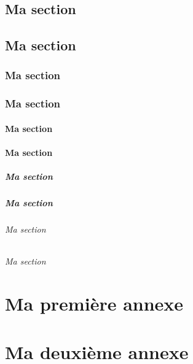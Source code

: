 \documentclass[overfullbox]{polytech/polytech}
\begin{document}
\section{Ma section}
\lipsum[1-5]

\section{Ma section}
\lipsum[1-5]

\subsection{Ma section}
\lipsum[1-5]
\subsection{Ma section}
\lipsum[1-5]
\subsubsection{Ma section}
\lipsum[1-5]
\subsubsection{Ma section}
\lipsum[1-5]
\paragraph{Ma section}
\lipsum[1-5]
\paragraph{Ma section}
\lipsum[1-5]
\subparagraph{Ma section}
\lipsum[1-5]
\subparagraph{Ma section}
\lipsum[1-5]


\appendix

\chapter{Ma première annexe}

\lipsum[1-4]

\chapter{Ma deuxième annexe}

\cite{article}

\lipsum[1-4]


\nocite{*}



\makelastpages
\end{document}
